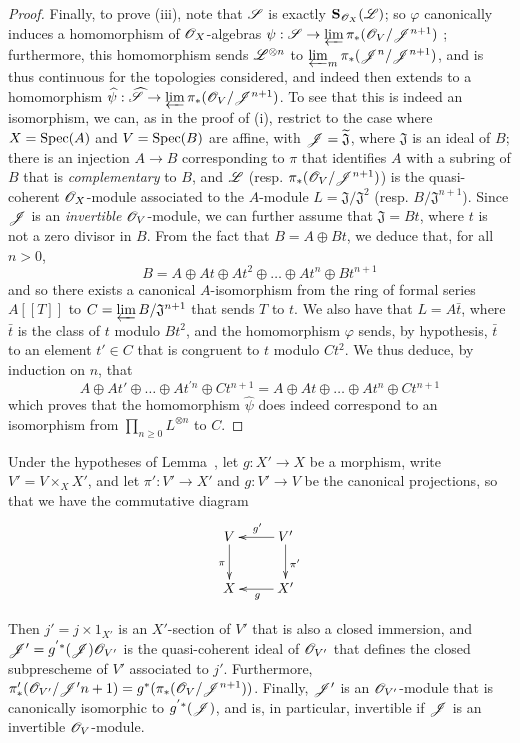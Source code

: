 \begin{proof}
Finally, to prove (iii), note that $\mathscr{S}$ is exactly $\mathbf{S}_{\mathscr{O}_X}(\mathscr{L})$;
so $\varphi$ canonically induces a homomorphism of $\mathscr{O}_X$-algebras $\psi:\sh{S}\to\varprojlim\pi_*(\sh{O}_V/\sh{J}^{n+1})$ ;
furthermore, this homomorphism sends $\mathscr{L}^{\otimes n}$ to $\varprojlim_m\pi_*(\mathscr{J}^n/\mathscr{J}^{n+1})$, and is thus continuous for the topologies considered, and indeed then extends to a homomorphism $\widehat{\psi}:\widehat{\sh{S}}\to\varprojlim\pi_*(\sh{O}_V/\sh{J}^{n+1})$.
To see that this is indeed an isomorphism, we can, as in the proof of (i), restrict to the case where $X=\operatorname{Spec}(A)$ and $V=\operatorname{Spec}(B)$ are affine, with $\mathscr{J}=\widetilde{\mathfrak{J}}$, where $\mathfrak{J}$ is an ideal of $B$;
there is an injection $A\to B$ corresponding to $\pi$ that identifies $A$ with a subring of $B$ that is \emph{complementary} to $B$, and $\mathscr{L}$ (resp. $\pi_*(\mathscr{O}_V/\mathscr{J}^{n+1})$) is the quasi-coherent $\mathscr{O}_X$-module associated to the $A$-module $L=\mathfrak{J}/\mathfrak{J}^2$ (resp. $B/\mathfrak{J}^{n+1}$).
Since $\mathscr{J}$ is an \emph{invertible} $\mathscr{O}_V$-module, we can further assume that $\mathfrak{J}=Bt$, where $t$ is not a zero divisor in $B$.
From the fact that $B=A\oplus Bt$, we deduce that, for all $n>0$,
\[
  B = A \oplus At \oplus At^2 \oplus \ldots \oplus At^n \oplus Bt^{n+1}
\]
and so there exists a canonical $A$-isomorphism from the ring of formal series $A[[T]]$ to $C=\varprojlim B/\mathfrak{J}^{n+1}$ that sends $T$ to $t$.
We also have that $L=A\bar{t}$, where $\bar{t}$ is the class of $t$ modulo $Bt^2$, and the homomorphism $\varphi$ sends, by hypothesis, $\bar{t}$ to an element $t'\in C$ that is congruent to $t$ modulo $Ct^2$.
We thus deduce, by induction on $n$, that
\[
  A \oplus At' \oplus \ldots \oplus At^{'n} \oplus Ct^{n+1}
  =
  A \oplus At \oplus \ldots \oplus At^n \oplus Ct^{n+1}
\]
which proves that the homomorphism $\widehat{\psi}$ does indeed correspond to an isomorphism from $\prod_{n\geq0}L^{\otimes n}$ to $C$.
\end{proof}

\begin{lemma}[8.10.2]
\label{II.8.10.2}
Under the hypotheses of Lemma~, let $g:X'\to X$ be a morphism,
write $V'=V\times_X X'$, and let $\pi':V'\to X'$ and $g:V'\to V$ be the canonical projections, so that we have the commutative diagram
\[
  \xymatrix{
    V
      \ar[d]_{\pi}
  & V'
      \ar[l]_{g'}
      \ar[d]^{\pi'}
  \\X
  & X'
      \ar[l]^{g}
  }
\]

Then $j'=j\times1_{X'}$ is an $X'$-section of $V'$ that is also a closed immersion, and $\mathscr{J}'=g^{'*}(\mathscr{J})\mathscr{O}_{V'}$ is the quasi-coherent ideal of $\mathscr{O}_{V'}$ that defines the closed subprescheme of $V'$ associated to $j'$.
Furthermore, $\pi'_*(\mathscr{O}_{V'}/\mathscr{J}{'n+1}) = g^*(\pi_*(\mathscr{O}_V/\mathscr{J}^{n+1}))$.
Finally, $\mathscr{J}'$ is an $\mathscr{O}_{V'}$-module that is canonically isomorphic to $g^{'*}(\mathscr{J})$, and is, in particular, invertible if $\mathscr{J}$ is an invertible $\mathscr{O}_V$-module.
\end{lemma}

